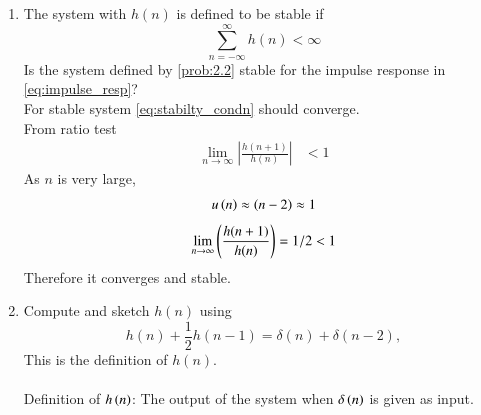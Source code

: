\documentclass[journal,12pt,twocolumn]{IEEEtran}
\theoremstyle{remark}
\begin{document}
\begin{enumerate}[label=\thesection.\arabic*
,ref=\thesection.\theenumi]
\begin{enumerate}[label=\thesection.\arabic*
,ref=\thesection.\theenumi]
\begin{enumerate}[label=\thesection.\arabic*
,ref=\thesection.\theenumi]
\begin{figure}[ht]
\begin{center}
    \caption{$h(n)$}
\end{center}
    \label{fig:plot3}
\end{figure}
\item The system with $h(n)$ is defined to be stable if
\begin{equation}
\sum_{n=-\infty}^{\infty}h(n) < \infty \label{eq:stabilty_condn}
\end{equation}
Is the system defined by \eqref{prob:2.2} stable for the impulse response in \eqref{eq:impulse_resp}?\\
\solution For stable system \eqref{eq:stabilty_condn} should converge.\\
From ratio test
\begin{align}
    \lim_{n \to \infty}\left|\frac{h(n + 1)}{h(n)}\right|&<1 
\end{align}
As $n$ is very large,
\begin{align}
    u\left(n\right)\approx \left(n-2\right)\approx 1
\end{align}
\begin{align}
  \lim_{n \to \infty}  \left(\frac{h(n + 1)}{h(n)}\right) = 1/2 <1
\end{align}
Therefore it converges and stable.
\item 
Compute and sketch $h(n)$ using 
\begin{equation}
\label{eq:iir_filter_h}
h(n) + \frac{1}{2}h(n-1) = \delta(n) + \delta(n-2), 
\end{equation}
%
This is the definition of $h(n)$.
\\
\solution\\
Definition of $h\left(n\right)$: The output of the system when $\delta\left(n\right)$ is given as input.\\


\end{enumerate}
\end{enumerate}
\end{enumerate}
\end{document}
